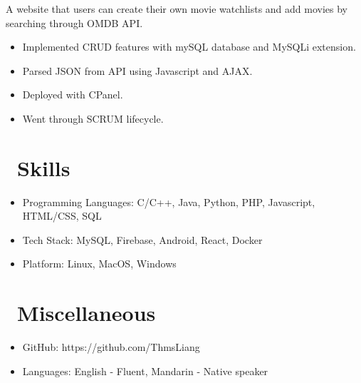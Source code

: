 \documentclass{resume}
\begin{document}
A website that users can create their own movie watchlists and add movies by searching through OMDB API.
\begin{itemize}
  \item Implemented CRUD features with mySQL database and MySQLi extension.
  \item Parsed JSON from API using Javascript and AJAX.
  \item Deployed with CPanel.
  \item Went through SCRUM lifecycle.
\end{itemize}



\section{\faCogs\ Skills}
\begin{itemize}[parsep=0.5ex]
  \item Programming Languages: C/C++, Java, Python, PHP, Javascript, HTML/CSS, SQL
  \item Tech Stack: MySQL, Firebase, Android, React, Docker
  \item Platform: Linux, MacOS, Windows
\end{itemize}

\section{\faInfo\ Miscellaneous}
\begin{itemize}[parsep=0.5ex]
  \item GitHub: https://github.com/ThmsLiang
  \item Languages: English - Fluent, Mandarin - Native speaker
\end{itemize}

%
%
\end{document}
